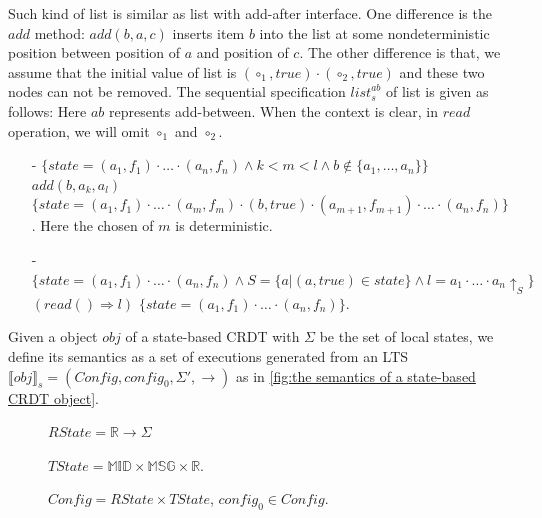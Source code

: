 {\begin{example}
\label{definition:sequential specification of list with add-after interface}
Such kind of list is similar as list with add-after interface. One difference is the $\mathit{add}$ method: $\mathit{add}(b,a,c)$ inserts item $b$ into the list at some nondeterministic position between position of $a$ and position of $c$. The other difference is that, we assume that the initial value of list is $(\circ_1,\mathit{true}) \cdot (\circ_2,\mathit{true})$ and these two nodes can not be removed. The sequential specification $\mathit{list}_s^{\mathit{ab}}$ of list is given as follows: Here $\mathit{ab}$ represents add-between. When the context is clear, in $\mathit{read}$ operation, we will omit $\circ_1$ and $\circ_2$.
\begin{itemize}
\setlength{\itemsep}{0.5pt}
\item[-] $\{ \mathit{state} = (a_1,f_1) \cdot \ldots \cdot (a_n,f_n) \wedge k < m < l \wedge b \notin \{ a_1, \ldots, a_n \} \}$ $add(b,a_k,a_l)$ $\{ \mathit{state} = (a_1,f_1) \cdot \ldots \cdot (a_m,f_m) \cdot (b,\mathit{true}) \cdot (a_{m+1},f_{m+1}) \cdot \ldots \cdot (a_n,f_n) \}$. Here the chosen of $m$ is deterministic.
\item[-] $\{ \mathit{state} = (a_1,f_1) \cdot \ldots \cdot (a_n,f_n) \wedge S = \{ a \vert (a,\mathit{true}) \in \mathit{state} \} \wedge l = a_1 \cdot \ldots \cdot a_n \uparrow_{S} \}$ $(read() \Rightarrow l)$ $\{ \mathit{state} = (a_1,f_1) \cdot \ldots \cdot (a_n,f_n) \}$.
\end{itemize}
\end{example}










Given a object $\mathit{obj}$ of a state-based CRDT with $\Sigma$ be the set of local states, we define its semantics as a set of executions generated from an LTS $\llbracket \mathit{obj} \rrbracket_s = (\mathit{Config},\mathit{config}_0,\Sigma',\rightarrow)$ as in \autoref{fig:the semantics of a state-based CRDT object}.

\begin{figure}[ht]
$\mathit{RState} = \mathbb{R} \rightarrow \Sigma$

$\mathit{TState} = \mathbb{MID} \times \mathbb{MSG} \times \mathbb{R}$.

$\mathit{Config} = \mathit{RState} \times \mathit{TState}$, $\mathit{config}_0 \in \mathit{Config}$.


\end{figure}}
